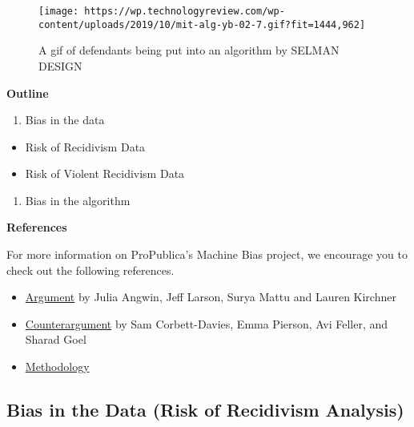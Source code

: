 \documentclass[
]{book}
\providecommand{\tightlist}{%
  \setlength{\itemsep}{0pt}\setlength{\parskip}{0pt}}
\begin{document}
\begin{figure}
\centering
\texttt{[image: https://wp.technologyreview.com/wp-content/uploads/2019/10/mit-alg-yb-02-7.gif?fit=1444,962]}
\caption{A gif of defendants being put into an algorithm by SELMAN DESIGN}
\end{figure}

\textbf{Outline}

\begin{enumerate}
\def\labelenumi{\arabic{enumi}.}
\tightlist
\item
  Bias in the data
\end{enumerate}

\begin{itemize}
\tightlist
\item
  Risk of Recidivism Data
\item
  Risk of Violent Recidivism Data
\end{itemize}

\begin{enumerate}
\def\labelenumi{\arabic{enumi}.}
\setcounter{enumi}{1}
\tightlist
\item
  Bias in the algorithm
\end{enumerate}

\textbf{References}

For more information on ProPublica's Machine Bias project, we encourage you to check out the following references.

\begin{itemize}
\item
  \href{https://www.propublica.org/article/machine-bias-risk-assessments-in-criminal-sentencing/}{Argument} by Julia Angwin, Jeff Larson, Surya Mattu and Lauren Kirchner
\item
  \href{https://www.washingtonpost.com/news/monkey-cage/wp/2016/10/17/can-an-algorithm-be-racist-our-analysis-is-more-cautious-than-propublicas/}{Counterargument} by Sam Corbett-Davies, Emma Pierson, Avi Feller, and Sharad Goel
\item
  \href{https://www.propublica.org/article/how-we-analyzed-the-compas-recidivism-algorithm/}{Methodology}
\end{itemize}

\hypertarget{bias-in-the-data-risk-of-recidivism-analysis}{%
\subsection{Bias in the Data (Risk of Recidivism Analysis)}\label{bias-in-the-data-risk-of-recidivism-analysis}}
\end{document}
